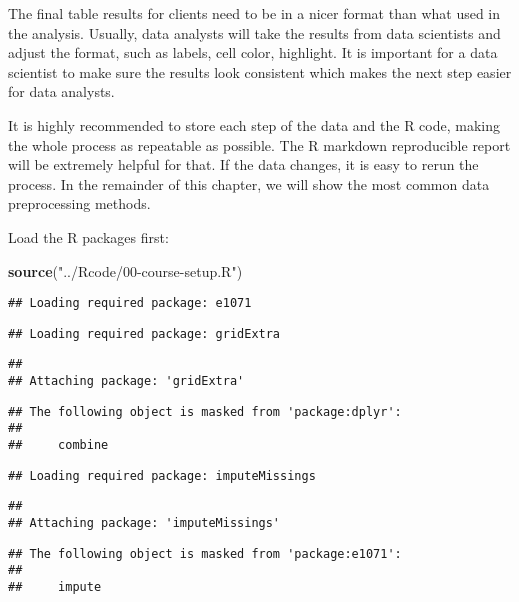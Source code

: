 \documentclass[
]{article}
\newenvironment{Shaded}{\begin{snugshade}}{\end{snugshade}}
\newcommand{\KeywordTok}[1]{\textcolor[rgb]{0.13,0.29,0.53}{\textbf{#1}}}
\newcommand{\NormalTok}[1]{#1}
\newcommand{\StringTok}[1]{\textcolor[rgb]{0.31,0.60,0.02}{#1}}
\begin{document}
The final table results for clients need to be in a nicer format than
what used in the analysis. Usually, data analysts will take the results
from data scientists and adjust the format, such as labels, cell color,
highlight. It is important for a data scientist to make sure the results
look consistent which makes the next step easier for data analysts.

It is highly recommended to store each step of the data and the R code,
making the whole process as repeatable as possible. The R markdown
reproducible report will be extremely helpful for that. If the data
changes, it is easy to rerun the process. In the remainder of this
chapter, we will show the most common data preprocessing methods.

Load the R packages first:

\begin{Shaded}
\begin{Highlighting}[]
\KeywordTok{source}\NormalTok{(}\StringTok{"../Rcode/00-course-setup.R"}\NormalTok{)}
\end{Highlighting}
\end{Shaded}

\begin{verbatim}
## Loading required package: e1071
\end{verbatim}

\begin{verbatim}
## Loading required package: gridExtra
\end{verbatim}

\begin{verbatim}
## 
## Attaching package: 'gridExtra'
\end{verbatim}

\begin{verbatim}
## The following object is masked from 'package:dplyr':
## 
##     combine
\end{verbatim}

\begin{verbatim}
## Loading required package: imputeMissings
\end{verbatim}

\begin{verbatim}
## 
## Attaching package: 'imputeMissings'
\end{verbatim}

\begin{verbatim}
## The following object is masked from 'package:e1071':
## 
##     impute
\end{verbatim}
\end{document}

